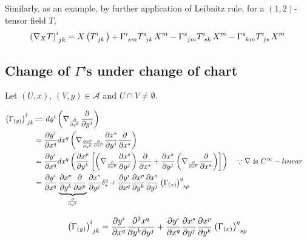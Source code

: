 Similarly, as an example, by further application of Leibnitz rule, for a $(1,2)$-tensor field $T$,
\begin{align*}
  \left(\nabla_X T\right)\indices{^i_{jk}} = X\left(T\indices{^i_{jk}}\right) + \ccf{i}{sm} T\indices{^s_{jk}} X^m - \ccf{s}{jm} T\indices{^i_{sk}} X^m - \ccf{s}{km} T\indices{^i_{js}} X^m
\end{align*}


\subsection{Change of $\Gamma$'s under change of chart}
Let $(U,x)$, $(V,y) \in \mathcal{A}$ and $U \cap V \neq \emptyset$.

\begin{align*}
\ccfx{i}{jk}{(y)} & := dy^i \left(\nabla_{\cibasis{y^k}} \cibasis{y^j} \right) \\
& = \cibasis[y^i]{x^q} dx^q \left(\nabla_{\cibasis[x^p]{y^k} \cibasis{x^p}} \cibasis[x^s]{y^j} \cibasis{x^s} \right) \\
& = \cibasis[y^i]{x^q} dx^q \left(\cibasis[x^p]{y^k} \left[ \left(\nabla_{\cibasis{x^p}} \cibasis[x^s]{y^j} \right) \cibasis{x^s} + \cibasis[x^s]{y^j} \left(\nabla_{\cibasis{x^p}} \cibasis{x^s} \right) \right] \right) && \because \nabla \text{ is } C^{\infty}-linear \\
& = \cibasis[y^i]{x^q} \underbrace{\cibasis[x^p]{y^k} \cibasis{x^p}}_{\cibasis{y^k}} \cibasis[x^s]{y^j} \delta^q_s + \cibasis[y^i]{x^q} \cibasis[x^p]{y^k} \cibasis[x^s]{y^j} \ccfx{q}{sp}{(x)}
\end{align*}

\begin{equation}\label{Eq:WEHCG0703_changeofGamma}
\ccfx{i}{jk}{(y)} = \cibasis[y^i]{x^q} \frac{\partial^2 x^q}{\partial y^k \partial y^j} + \cibasis[y^i]{x^q} \cibasis[x^s]{y^j} \cibasis[x^p]{y^k} \ccfx{q}{sp}{(x)}
\end{equation}

